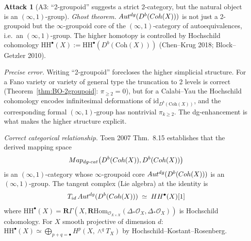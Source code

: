 \documentclass[11pt]{amsart}
\theoremstyle{definition}
\newtheorem{attack}{Attack}
\providecommand{\Coh}{\mathrm{Coh}}
\providecommand{\Autdg}{\mathrm{Aut}^{\rm dg}}
\providecommand{\cO}{\mathcal{O}}
\providecommand{\bR}{\mathbf{R}}
\begin{document}
\begin{attack}[A3: ``2-groupoid'' suggests a strict 2-category, but
the natural object is an $(\infty,1)$-group]
\leavevmode

\noindent\emph{Ghost theorem.} $\Autdg(D^b(\Coh(X)))$ is not just a
2-groupoid but the $\infty$-groupoid core of the
$(\infty,1)$-category of autoequivalences, i.e.\ an
$(\infty,1)$-group. The higher homotopy is controlled by Hochschild
cohomology $\mathrm{HH}^\bullet(X) := \mathrm{HH}^\bullet(D^b(\Coh(X)))$
(Chen--Krug 2018; Block--Getzler 2010).

\noindent\emph{Precise error.} Writing ``2-groupoid'' forecloses the
higher simplicial structure. For a Fano variety or variety of general
type the truncation to 2 levels is correct
(Theorem~\ref{thm:BO-2groupoid}: $\pi_{\geq 2} = 0$), but for a
Calabi--Yau the Hochschild cohomology encodes infinitesimal
deformations of $\mathrm{id}_{D^b(\Coh(X))}$, and the corresponding
formal $(\infty,1)$-group has nontrivial $\pi_{k \geq 2}$. The
dg-enhancement is what makes the higher structure explicit.

\noindent\emph{Correct categorical relationship.} Toen 2007 Thm.~8.15
establishes that the derived mapping space
\[
 \mathrm{Map}_{\rm dg\text{-}cat}\bigl(D^b(\Coh(X)), D^b(\Coh(X))\bigr)
\]
is an $(\infty,1)$-category whose $\infty$-groupoid core
$\Autdg(D^b(\Coh(X)))$ is an $(\infty,1)$-group. The tangent
complex (Lie algebra) at the identity is
\[
 T_{\mathrm{id}}\, \Autdg(D^b(\Coh(X))) \;\simeq\;
 \mathrm{HH}^\bullet(X)[1]
\]
where $\mathrm{HH}^\bullet(X) = \bR\Gamma(X, \bR\mathrm{Hom}_{\cO_{X\times X}}
(\Delta_* \cO_X, \Delta_* \cO_X))$ is Hochschild cohomology. For
$X$ smooth projective of dimension $d$:
$\mathrm{HH}^\bullet(X) \simeq \bigoplus_{p + q = \bullet}
H^p(X, \wedge^q T_X)$ by Hochschild--Kostant--Rosenberg.
\end{attack}
\end{document}

